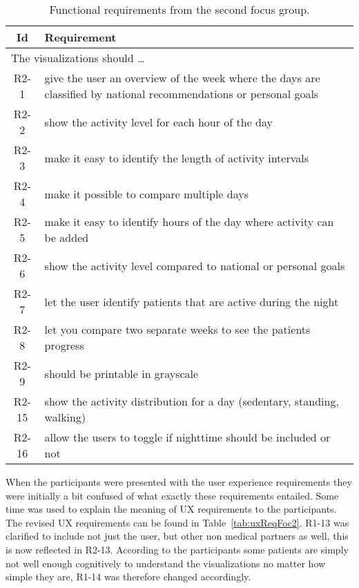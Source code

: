 \begin{table}[h!]
  \begin{center}
  \begin{tabular}{|c|p{12cm}|}
    \hline
      \textbf{Id} & \textbf{Requirement} \\ \hline
    \multicolumn{2}{|l|}{The visualizations should \ldots} \\ \hline
      R2-1 & give the user an overview of the week where the days are classified by national recommendations or personal goals \\ \hline
      R2-2 & show the activity level for each hour of the day \\ \hline
      R2-3 & make it easy to identify the length of activity intervals \\ \hline
      R2-4 & make it possible to compare multiple days \\ \hline
      R2-5 & make it easy to identify hours of the day where activity can be added \\ \hline
      R2-6 & show the activity level compared to national or personal goals \\ \hline
      R2-7 & let the user identify patients that are active during the night \\ \hline
      R2-8 & let you compare two separate weeks to see the patients progress \\ \hline
      R2-9 & should be printable in grayscale \\ \hline
      R2-15 & show the activity distribution for a day (sedentary, standing, walking) \\ \hline
      R2-16 & allow the users to toggle if nighttime should be included or not \\ \hline
  \end{tabular}
  \end{center}
  \caption{Functional requirements from the second focus group.}
  \label{tab:reqFoc2}
\end{table}

When the participants were presented with the user experience requirements they were initially a bit confused of what exactly these requirements entailed. Some time was used to explain the meaning of UX requirements to the participants. The revised UX requirements can be found in Table~\ref{tab:uxReqFoc2}. R1-13 was clarified to include not just the user, but other non medical partners as well, this is now reflected in R2-13. According to the participants some patients are simply not well enough cognitively to understand the visualizations no matter how simple they are, R1-14 was therefore changed accordingly.


